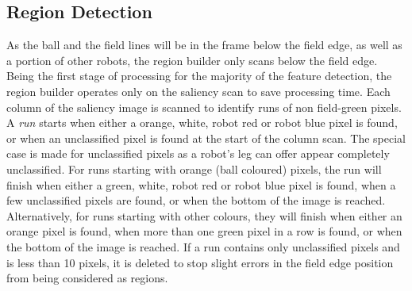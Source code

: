\documentclass[pdftex,11pt,a4paper]{report}
\begin{document}
\subsection{Region Detection}
As the ball and the field lines will be in the frame below the field edge, as well as a portion of other robots, the region builder only scans below the field edge. Being the first stage of processing for the majority of the feature detection, the region builder operates only on the saliency scan to save processing time. Each column of the saliency image is scanned to identify runs of non field-green pixels. A \emph{run} starts when either a orange, white, robot red or robot blue pixel is found, or when an unclassified pixel is found at the start of the column scan. The special case is made for unclassified pixels as a robot's leg can offer appear completely unclassified. For runs starting with orange (ball coloured) pixels, the run will finish when either a green, white, robot red or robot blue pixel is found, when a few unclassified pixels are found, or when the bottom of the image is reached. Alternatively, for runs starting with other colours, they will finish when either an orange pixel is found, when more than one green pixel in a row is found, or when the bottom of the image is reached. If a run contains only unclassified pixels and is less than 10 pixels, it is deleted to stop slight errors in the field edge position from being considered as regions.
\end{document}

